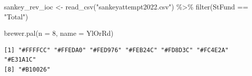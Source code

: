 \documentclass[
  letterpaper,
  DIV=11,
  numbers=noendperiod]{scrreport}
\newenvironment{Shaded}{\begin{snugshade}}{\end{snugshade}}
\newcommand{\AttributeTok}[1]{\textcolor[rgb]{0.40,0.45,0.13}{#1}}
\newcommand{\DecValTok}[1]{\textcolor[rgb]{0.68,0.00,0.00}{#1}}
\newcommand{\FunctionTok}[1]{\textcolor[rgb]{0.28,0.35,0.67}{#1}}
\newcommand{\NormalTok}[1]{\textcolor[rgb]{0.00,0.23,0.31}{#1}}
\newcommand{\OtherTok}[1]{\textcolor[rgb]{0.00,0.23,0.31}{#1}}
\newcommand{\SpecialCharTok}[1]{\textcolor[rgb]{0.37,0.37,0.37}{#1}}
\newcommand{\StringTok}[1]{\textcolor[rgb]{0.13,0.47,0.30}{#1}}
\begin{document}
\begin{Shaded}
\begin{Highlighting}[]
\NormalTok{sankey\_rev\_ioc }\OtherTok{\textless{}{-}} \FunctionTok{read\_csv}\NormalTok{(}\StringTok{"sankeyattempt2022.csv"}\NormalTok{) }\SpecialCharTok{\%\textgreater{}\%} 
  \FunctionTok{filter}\NormalTok{(StFund }\SpecialCharTok{==} \StringTok{"Total"}\NormalTok{)}


\FunctionTok{brewer.pal}\NormalTok{(}\AttributeTok{n =} \DecValTok{8}\NormalTok{, }\AttributeTok{name =} \StringTok{\textquotesingle{}YlOrRd\textquotesingle{}}\NormalTok{)}
\end{Highlighting}
\end{Shaded}

\begin{verbatim}
[1] "#FFFFCC" "#FFEDA0" "#FED976" "#FEB24C" "#FD8D3C" "#FC4E2A" "#E31A1C"
[8] "#B10026"
\end{verbatim}
\end{document}
